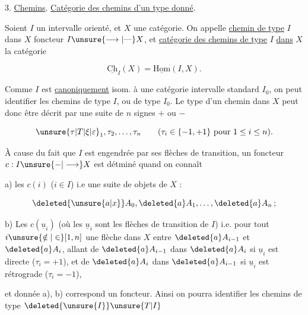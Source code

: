 

3.  \uline{Chemins}. \uline{Catégorie des chemins d'un type donné}.

Soient $I$ un intervalle orienté, et $X$ une catégorie. On appelle \uline{chemin de type} $I$ dans $X$  foncteur $I\unsure{\longrightarrow|\text{---}}X$,  et \uline{catégorie des chemins de type} $I$ \uline{dans} $X$ la catégorie

\[\underline{\mathrm{Ch}}_I(X)=\underline{\mathrm{Hom}}(I,X).\]

Comme $I$ est \uline{canoniquement} isom. à une catégorie intervalle standard $I_0$,   on peut identifier les chemins de type $I$, ou de type $I_0$. Le type  d'un chemin  dans $X$ peut donc être décrit par une suite de $n$ signes $+$ ou $-$

\[\unsure{\tau|T|\xi|\varepsilon}_1,\tau_2,\ldots,\tau_n\qquad(\tau_i\in\{-1,+1\}\text{ pour }1\leq i\leq n).\]

À cause du fait que $I$ est engendrée par ses flèches de transition, un foncteur $c:I\unsure{-|\longrightarrow}X$ est détminé  quand on connaît

a) les $c(i)$ ($i\in I$) i.e une suite de  objets de $X$ :

\[\deleted{\unsure{a|x}}A_0,\deleted{a}A_1,\ldots,\deleted{a}A_n\,;\]


b) Les  $c(\underline{u}_i)$ (où les $\underline{u}_i$ sont les flèches de transition de $I$) i.e. pour tout $i\unsure{\notin|\in}[1,n]$ une flèche  dans $X$ entre $\deleted{a}A_{i-1}$ et $\deleted{a}A_i$, allant de $\deleted{a}A_{i-1}$ dans $\deleted{a}A_i$ si $\underline{u}_i$ est directe ($\tau_i=+1$), et de $\deleted{a}A_i$ dans $\deleted{a}A_{i-1}$ si $\underline{u}_i$ est rétrograde ($\tau_i=-1$),

et   donnée a), b) correspond un foncteur. Ainsi on pourra identifier les chemins de type $\deleted{\unsure{I}}\unsure{T|I}$


